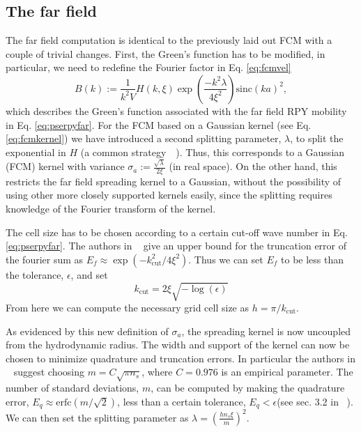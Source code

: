 \documentclass[twoside,openright,titlepage,numbers=noenddot,%
headinclude,footinclude,cleardoublepage=empty,abstract=on,
BCOR=5mm,fontsize=11pt, dvipsnames, paper=b5
]{scrreprt}
\newcommand{\sinc}{\textrm{sinc}}
\begin{document}
\subsection*{The far field}

The far field computation is identical to the previously laid out \gls{FCM} with a couple of trivial changes.
First, the Green's function has to be modified, in particular, we need to redefine the Fourier factor in Eq. \eqref{eq:fcmvel}
\begin{equation}
  B(k) := \frac{1}{k^2V}H(k,\xi)\exp\left(\frac{-k^2\lambda}{4\xi^2}\right)\sinc(ka)^2,
\end{equation}
which describes the Green's function associated with the far field \gls{RPY} mobility in Eq. \eqref{eq:pserpyfar}. For the \gls{FCM} based on a Gaussian kernel (see Eq. \eqref{eq:fcmkernel}) we have introduced a second splitting parameter, $\lambda$, to split the exponential in $H$ (a common strategy~\cite{Lindbo2011}~\cite{Wang2016}). Thus, this corresponds to a Gaussian (\gls{FCM}) kernel with variance $\sigma_a := \frac{\sqrt{\lambda}}{2\xi}$ (in real space). On the other hand, this restricts the far field spreading kernel to a Gaussian, without the possibility of using other more closely supported kernels easily, since the splitting requires knowledge of the Fourier transform of the kernel.

The cell size has to be chosen according to a certain cut-off wave number in Eq. \eqref{eq:pserpyfar}. The authors in ~\cite{Lindbo2010} give an upper bound for the truncation error of the fourier sum as $E_f \approx \exp(-k_{\textrm{cut}}^2/4\xi^2)$. Thus we can set $E_f$ to be less than the tolerance, $\epsilon$, and set
\begin{equation}
  k_{\textrm{cut}} = 2\xi\sqrt{-\log(\epsilon)}
\end{equation}
From here we can compute the necessary grid cell size as $h = \pi/k_{\textrm{cut}}$.

As evidenced by this new definition of $\sigma_a$, the spreading kernel is now uncoupled from the hydrodynamic radius. The width and support of the kernel can now be chosen to minimize quadrature and truncation errors. In particular the authors in ~\cite{Lindbo2011} suggest choosing $m = C\sqrt{\pi n_s}$, where $C = 0.976$ is an empirical parameter. The number of standard deviations, $m$, can be computed by making the quadrature error, $E_q \approx \textrm{erfc}(m/\sqrt{2})$, less than a certain tolerance, $E_q<\epsilon$(see sec. 3.2 in ~\cite{Lindbo2011}). We can then set the splitting parameter as $\lambda = \left(\frac{hn_s\xi}{m}\right)^2$.
\end{document}
